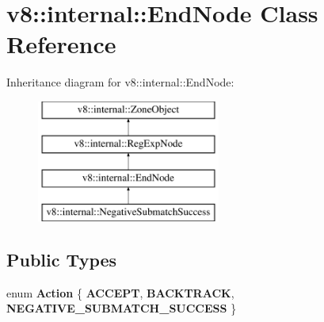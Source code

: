 \hypertarget{classv8_1_1internal_1_1EndNode}{}\section{v8\+:\+:internal\+:\+:End\+Node Class Reference}
\label{classv8_1_1internal_1_1EndNode}
Inheritance diagram for v8\+:\+:internal\+:\+:End\+Node\+:\begin{figure}[H]
\begin{center}
\leavevmode
\includegraphics[height=4.000000cm]{classv8_1_1internal_1_1EndNode}
\end{center}
\end{figure}
\subsection*{Public Types}
\begin{DoxyCompactItemize}
\item 
\mbox{\label{classv8_1_1internal_1_1EndNode_abac30d22b1fc00be81e100180e4ca83a}} 
enum {\bfseries Action} \{ {\bfseries A\+C\+C\+E\+PT}, 
{\bfseries B\+A\+C\+K\+T\+R\+A\+CK}, 
{\bfseries N\+E\+G\+A\+T\+I\+V\+E\+\_\+\+S\+U\+B\+M\+A\+T\+C\+H\+\_\+\+S\+U\+C\+C\+E\+SS}
 \}
\end{DoxyCompactItemize}
